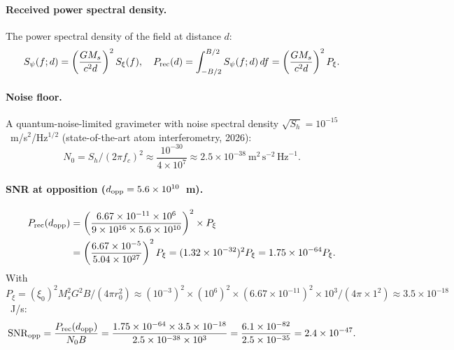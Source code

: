 \documentclass[aps,prd,twocolumn,superscriptaddress,nofootinbib]{revtex4-2}
\newcommand{\SNR}{\mathrm{SNR}}
\begin{document}
\paragraph{Received power spectral density.}
The power spectral density of the field at distance $d$:
\begin{equation}
S_\psi(f; d) = \left(\frac{G M_s}{c^2 d}\right)^2 S_\xi(f),
\quad P_{\rm rec}(d) = \int_{-B/2}^{B/2} S_\psi(f;d)\,df
= \left(\frac{G M_s}{c^2 d}\right)^2 P_\xi.
\label{eq:P-rec}
\end{equation}

\paragraph{Noise floor.}
A quantum-noise-limited gravimeter with noise spectral density
$\sqrt{S_h} = 10^{-15}$~m/s$^2$/Hz$^{1/2}$ (state-of-the-art
atom interferometry, 2026):
\begin{equation}
N_0 = S_h / (2\pi f_c)^2 \approx \frac{10^{-30}}{4\times 10^7}
\approx 2.5\times 10^{-38}~\text{m}^2\,\text{s}^{-2}\,\text{Hz}^{-1}.
\label{eq:N0}
\end{equation}

\paragraph{SNR at opposition ($d_{\rm opp} = 5.6\times10^{10}$~m).}
\begin{align}
P_{\rm rec}(d_{\rm opp})
&= \left(\frac{6.67\times10^{-11} \times 10^6}
         {9\times10^{16} \times 5.6\times10^{10}}\right)^2
  \times P_\xi \nonumber \\
&= \left(\frac{6.67\times10^{-5}}{5.04\times10^{27}}\right)^2 P_\xi
= (1.32\times10^{-32})^2 P_\xi
= 1.75\times10^{-64} P_\xi.
\label{eq:Prec-opp}
\end{align}
With $P_\xi = (\xi_0)^2 M_s^2 G^2 B / (4\pi r_0^2) \approx
(10^{-3})^2 \times (10^6)^2 \times (6.67\times10^{-11})^2 \times 10^3
/ (4\pi \times 1^2) \approx 3.5\times10^{-18}$~J/s:
\begin{equation}
\SNR_{\rm opp} = \frac{P_{\rm rec}(d_{\rm opp})}{N_0 B}
= \frac{1.75\times10^{-64} \times 3.5\times10^{-18}}
       {2.5\times10^{-38} \times 10^3}
= \frac{6.1\times10^{-82}}{2.5\times10^{-35}}
= 2.4\times10^{-47}.
\label{eq:SNR-opp-raw}
\end{equation}
\end{document}
